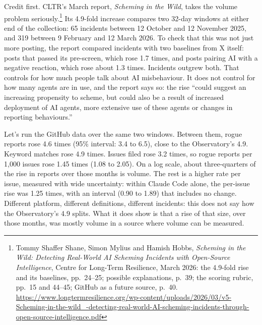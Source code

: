 Credit first. CLTR’s March report, \emph{Scheming in the Wild}, takes the volume problem seriously.\footnote{Tommy Shaffer Shane, Simon Mylius and Hamish Hobbs, \emph{Scheming in the Wild: Detecting Real-World AI Scheming Incidents with Open-Source Intelligence}, Centre for Long-Term Resilience, March 2026: the 4.9-fold rise and its baselines, pp.~24–25; possible explanations, p.~39; the scoring rubric, pp.~15 and 44–45; GitHub as a future source, p.~40. \url{https://www.longtermresilience.org/wp-content/uploads/2026/03/v5-Scheming-in-the-wild_-detecting-real-world-AI-scheming-incidents-through-open-source-intelligence.pdf}} Its 4.9-fold increase compares two 32-day windows at either end of the collection: 65 incidents between 12 October and 12 November 2025, and 319 between 9 February and 12 March 2026. To check that this was not just more posting, the report compared incidents with two baselines from X itself: posts that passed its pre-screen, which rose 1.7 times, and posts pairing AI with a negative reaction, which rose about 1.3 times. Incidents outgrew both. That controls for how much people talk about AI misbehaviour. It does not control for how many agents are in use, and the report says so: the rise “could suggest an increasing propensity to scheme, but could also be a result of increased deployment of AI agents, more extensive use of these agents or changes in reporting behaviours.”

Let’s run the GitHub data over the same two windows. Between them, rogue reports rose 4.6 times (95\% interval: 3.4 to 6.5), close to the Observatory’s 4.9. Keyword matches rose 4.9 times. Issues filed rose 3.2 times, so rogue reports per 1,000 issues rose 1.45 times (1.08 to 2.05). On a log scale, about three-quarters of the rise in reports over those months is volume. The rest is a higher rate per issue, measured with wide uncertainty: within Claude Code alone, the per-issue rise was 1.25 times, with an interval (0.90 to 1.89) that includes no change. Different platform, different definitions, different incidents: this does not say how the Observatory’s 4.9 splits. What it does show is that a rise of that size, over those months, was mostly volume in a source where volume can be measured.

